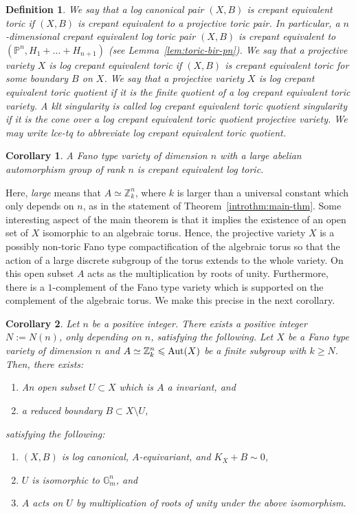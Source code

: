 \documentclass{amsart}
\newcommand{\pp}{\mathbb{P}}
\newcommand{\zz}{\mathbb{Z}}
\newtheorem{introdef}{Definition}
\newtheorem{introcor}{Corollary}
\theoremstyle{remark}
\numberwithin{equation}{section}
\begin{document}
\begin{introdef}\label{introdef}
{\em We say that a log canonical pair $(X,B)$ is {\em crepant equivalent toric} if $(X,B)$ is crepant equivalent  to a projective toric pair.
In particular, a $n$-dimensional  crepant equivalent  log toric pair $(X,B)$ is crepant equivalent  to
$(\pp^n, H_1+ \dots +H_{n+1})$ 
(see Lemma~\ref{lem:toric-bir-pn}).
We say that a projective variety $X$ is {\em log crepant equivalent  toric} if $(X,B)$ is crepant equivalent  toric for some boundary $B$ on $X$.
We say that a projective variety $X$ is {\em log crepant equivalent  toric quotient} if it is the finite quotient of a log crepant equivalent  toric variety. 
A klt singularity is called {\em log crepant equivalent  toric quotient singularity} if it is the cone over
a log crepant equivalent  toric quotient projective variety.
We may write {\em lce-tq} to abbreviate {\em log crepant equivalent toric quotient}.
}
\end{introdef}

\begin{introcor}\label{introcor-easy-version}
A Fano type variety of dimension $n$ with a large
abelian automorphism group of rank $n$ is crepant equivalent  log toric.
\end{introcor}

Here, {\em large} means that $A\simeq \zz^n_k$, where $k$ is larger than a universal constant
which only depends on $n$, as in the statement of Theorem~\ref{introthm:main-thm}.
Some interesting aspect of the main theorem is that it implies the existence of an open set of $X$ isomorphic to an algebraic torus.
Hence, the projective variety $X$ is a possibly non-toric Fano type compactification of the algebraic torus so that the action of a large discrete subgroup of the torus extends to the whole variety.
On this open subset $A$ acts as the multiplication by roots of unity.
Furthermore, there is a $1$-complement of the Fano type variety which is supported on the complement of the algebraic torus.
We make this precise in the next corollary.

\begin{introcor}\label{introcor1}
Let $n$ be a positive integer.
There exists a positive integer $N:=N(n)$, only depending on $n$, satisfying the following.
Let $X$ be a Fano type variety of dimension $n$ and $A\simeq \zz_k^n \leqslant {\rm Aut}(X)$ be a finite subgroup with $k\geq N$.
Then, there exists:
\begin{enumerate}
\item An open subset $U\subset X$ which is $A$ a invariant, and
\item a reduced boundary $B\subset X\setminus U$,
\end{enumerate} 
satisfying the following:
\begin{enumerate} 
\item $(X,B)$ is log canonical,
$A$-equivariant, and $K_X+B\sim 0$,
\item $U$ is isomorphic to $\mathbb{G}_m^n$, and
\item $A$ acts on $U$ by multiplication of roots of unity under the
above isomorphism.
\end{enumerate} 
\end{introcor}
\end{document}
